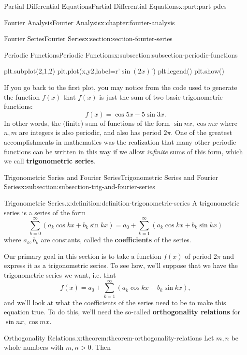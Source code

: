 \documentclass[twoside,10pt,]{book}
\newcommand{\terminology}[1]{\textbf{#1}}
\numberwithin{equation}{part}
\begin{document}
\begin{partptx}{Partial Differential Equations}{}{Partial Differential Equations}{}{}{x:part:part-pdes}
\begin{chapterptx}{Fourier Analysis}{}{Fourier Analysis}{}{}{x:chapter:fourier-analysis}
\begin{sectionptx}{Fourier Series}{}{Fourier Series}{}{}{x:section:section-fourier-series}
\begin{subsectionptx}{Periodic Functions}{}{Periodic Functions}{}{}{x:subsection:subsection-periodic-functions}
\begin{sageinput}
plt.subplot(2,1,2)
plt.plot(x,y2,label=r'$\sin(2x)$')
plt.legend()
plt.show()
\end{sageinput}
If you go back to the first plot, you may notice from the code used to generate the function \(f(x)\) that \(f(x)\) is just the sum of two basic trigonometric functions:%
\begin{equation*}
f(x) = \cos5x-5\sin3x.
\end{equation*}
In other words, the (finite) sum of functions of the form \(\sin nx,\cos mx\) where \(n,m\) are integers is also periodic, and also has period \(2\pi\). One of the greatest accomplishments in mathematics was the realization that many other periodic functions can be written in this way if we allow \emph{infinite} sums of this form, which we call \terminology{trigonometric series}.%
\end{subsectionptx}
%
%
\typeout{************************************************}
\typeout{************************************************}
%
\begin{subsectionptx}{Trigonometric Series and Fourier Series}{}{Trigonometric Series and Fourier Series}{}{}{x:subsection:subsection-trig-and-fourier-series}
\begin{definition}{Trigonometric Series.}{x:definition:definition-trigonometric-series}%
%
A trigonometric series is a series of the form%
\begin{equation*}
\sum_{k=0}^{\infty}(a_{k}\cos kx+b_{k}\sin kx) = a_{0} + \sum_{k=1}^{\infty}(a_{k}\cos kx+b_{k}\sin kx)
\end{equation*}
where \(a_{k},b_{k}\) are constants, called the \terminology{coefficients} of the series.%
\end{definition}
Our primary goal in this section is to take a function \(f(x)\) of period \(2\pi\) and express it as a trigonometric series. To see how, we'll suppose that we have the trigonometric series we want, i.e. that%
\begin{equation*}
f(x) = a_{0} + \sum_{k=1}^{\infty}(a_{k}\cos kx+b_{k}\sin kx),
\end{equation*}
and we'll look at what the coefficients of the series need to be to make this equation true. To do this, we'll need the so-called \terminology{orthogonality relations} for \(\sin nx,\cos mx\).%
\begin{theorem}{Orthogonality Relations.}{}{x:theorem:theorem-orthogonality-relations}%
%
Let \(m,n\) be whole numbers with \(m,n>0\). Then%

\end{theorem}
\end{subsectionptx}
\end{sectionptx}
\end{chapterptx}
\end{partptx}
\end{document}
